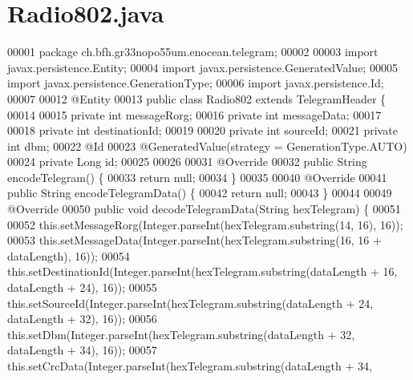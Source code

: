 \section{Radio802.\+java}
\label{Radio802_8java_source}

\begin{DoxyCode}
00001 \textcolor{keyword}{package }ch.bfh.gr33nopo55um.enocean.telegram;
00002 
00003 \textcolor{keyword}{import} javax.persistence.Entity;
00004 \textcolor{keyword}{import} javax.persistence.GeneratedValue;
00005 \textcolor{keyword}{import} javax.persistence.GenerationType;
00006 \textcolor{keyword}{import} javax.persistence.Id;
00007 
00012 @Entity
00013 \textcolor{keyword}{public} \textcolor{keyword}{class }Radio802 \textcolor{keyword}{extends} TelegramHeader \{
00014 
00015     \textcolor{keyword}{private} \textcolor{keywordtype}{int} messageRorg;
00016     \textcolor{keyword}{private} \textcolor{keywordtype}{int} messageData;
00017 
00018     \textcolor{keyword}{private} \textcolor{keywordtype}{int} destinationId;
00019 
00020     \textcolor{keyword}{private} \textcolor{keywordtype}{int} sourceId;
00021     \textcolor{keyword}{private} \textcolor{keywordtype}{int} dbm;
00022     @Id
00023     @GeneratedValue(strategy = GenerationType.AUTO)
00024     private Long \textcolor{keywordtype}{id};
00025 
00026 
00031     @Override
00032     public String encodeTelegram() \{
00033         \textcolor{keywordflow}{return} null;
00034     \}
00035 
00040     @Override
00041     \textcolor{keyword}{public} String encodeTelegramData() \{
00042         \textcolor{keywordflow}{return} null;
00043     \}
00044 
00049     @Override
00050     \textcolor{keyword}{public} \textcolor{keywordtype}{void} decodeTelegramData(String hexTelegram) \{
00051 
00052         this.setMessageRorg(Integer.parseInt(hexTelegram.substring(14, 16), 16));
00053         this.setMessageData(Integer.parseInt(hexTelegram.substring(16, 16 + 
      dataLength), 16));
00054         this.setDestinationId(Integer.parseInt(hexTelegram.substring(dataLength + 16, 
      dataLength + 24), 16));
00055         this.setSourceId(Integer.parseInt(hexTelegram.substring(dataLength + 24, 
      dataLength + 32), 16));
00056         this.setDbm(Integer.parseInt(hexTelegram.substring(dataLength + 32, 
      dataLength + 34), 16));
00057         this.setCrcData(Integer.parseInt(hexTelegram.substring(dataLength + 34, 

\end{DoxyCode}
